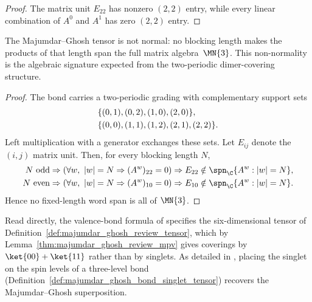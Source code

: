 \begin{proof}
    \leanok
    The matrix unit $E_{22}$ has nonzero $(2,2)$ entry, while every linear
    combination of $A^0$ and $A^1$ has zero $(2,2)$ entry.
\end{proof}

\begin{lemma}%
    \label{thm:majumdar_ghosh_not_normal}
    \leanok
    The Majumdar--Ghosh tensor is not normal: no blocking length makes the
    products of that length span the full matrix algebra~$\MN{3}$. This
    non-normality is the algebraic signature expected from the two-periodic
    dimer-covering structure.
\end{lemma}

\begin{proof}
    \leanok
    The bond carries a two-periodic grading with complementary support sets
    \begin{align}
         & \{(0,1),(0,2),(1,0),(2,0)\}, \notag \\
         & \{(0,0),(1,1),(1,2),(2,1),(2,2)\}.
        \notag
    \end{align}
    Left multiplication with a generator exchanges these sets. Let $E_{ij}$
    denote the $(i,j)$ matrix
    unit. Then, for every blocking length $N$,
    \begin{align}
        N\text{ odd}
         & \Rightarrow
        (\forall w,\ |w|=N \Rightarrow (A^w)_{22}=0)
        \Rightarrow
        E_{22}\notin\spn_{\C}\{A^w: |w|=N\},
        \notag         \\
        N\text{ even}
         & \Rightarrow
        (\forall w,\ |w|=N \Rightarrow (A^w)_{10}=0)
        \Rightarrow
        E_{10}\notin\spn_{\C}\{A^w: |w|=N\}.
        \notag
    \end{align}
    Hence no fixed-length word span is all of $\MN{3}$.
\end{proof}

\begin{remark}\label{rem:majumdar_ghosh_bond_dimension}
    Read directly, the valence-bond formula of \cite{Cirac2021Matrix}
    specifies the six-dimensional tensor of
    Definition~\ref{def:majumdar_ghosh_review_tensor}, which by
    Lemma~\ref{thm:majumdar_ghosh_review_mpv} gives coverings by
    $\ket{00}+\ket{11}$ rather than by singlets. As detailed in
    \cite{gap:rmp_majumdar_ghosh_tensor_gap}, placing the singlet on the spin
    levels of a three-level bond
    (Definition~\ref{def:majumdar_ghosh_bond_singlet_tensor}) recovers the
    Majumdar--Ghosh superposition.
\end{remark}

